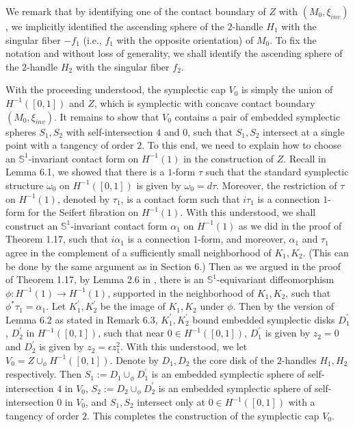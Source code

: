 \documentclass[11pt]{amsart}
\theoremstyle{plain}
\numberwithin{theorem}{section}
\theoremstyle{definition}
\newcommand{\s}{{\mathbb S}}
\begin{document}
We remark that by identifying one of the contact boundary of $Z$ with $(M_0,\xi_{inv})$, we implicitly
identified the ascending sphere of the $2$-handle $H_1$ with the singular fiber $-f_1$ (i.e., $f_1$ 
with the opposite orientation) of $M_0$. To fix the notation and without loss of generality, we shall identify
the ascending sphere of the $2$-handle $H_2$ with the singular fiber $f_2$. 

With the proceeding understood, the symplectic cap $V_0$ is simply the union of $H^{-1}([0,1])$ and $Z$, which is symplectic with concave contact boundary $(M_0,\xi_{inv})$. It remains to show that $V_0$ contains a pair of embedded symplectic spheres $S_1,S_2$ with self-intersection $4$ and $0$, such that $S_1,S_2$
intersect at a single point with a tangency of order $2$. To this end, we need to explain how to choose 
an $\s^1$-invariant contact form on $H^{-1}(1)$ in the construction of $Z$. Recall in Lemma 6.1,
we showed that there is a $1$-form $\tau$ such that the standard symplectic structure $\omega_0$ 
on $H^{-1}([0,1])$ is given by $\omega_0=d\tau$. Moreover, the restriction of $\tau$ on $H^{-1}(1)$, 
denoted by $\tau_1$, is a contact form such that $i\tau_1$ is a connection $1$-form for the Seifert 
fibration on $H^{-1}(1)$. With this understood, we shall construct an $\s^1$-invariant contact form $\alpha_1$ 
on $H^{-1}(1)$ as we did in the proof of Theorem 1.17, such that $i \alpha_1$ is a connection $1$-form, and moreover, $\alpha_1$ and $\tau_1$ agree in the complement of a sufficiently small neighborhood of
$K_1, K_2$. (This can be done by the same argument as in Section 6.) Then as we argued in the proof of 
Theorem 1.17, by Lemma 2.6 in \cite{C1}, there is an $\s^1$-equivariant diffeomorphism 
$\phi: H^{-1}(1)\rightarrow H^{-1}(1)$, supported in the neighborhood of 
$K_1,K_2$, such that $\phi^\ast \tau_1=\alpha_1$. Let $K_1^\prime, K_2^\prime$ be the image
of $K_1,K_2$ under $\phi$. Then by the version of Lemma 6.2 as stated in Remark 6.3, $K_1^\prime, K_2^\prime$
bound embedded symplectic disks $D_1^\prime$, $D_2^\prime$ in $H^{-1}([0,1])$, such that
near $0\in H^{-1}([0,1])$, $D_1^\prime$ is given by $z_2=0$ and $D_2^\prime$ is given by
$z_2=\epsilon z_1^2$. With this understood, we let $V_0=Z\cup_\phi H^{-1}([0,1])$. Denote by
$D_1,D_2$ the core disk of the $2$-handles $H_1,H_2$ respectively. Then $S_1:=D_1\cup_\phi 
D_1^\prime$ is an embedded symplectic sphere of self-intersection $4$ in $V_0$,
$S_2:=D_2\cup_\phi D_2^\prime$ is an embedded symplectic sphere of self-intersection $0$ in $V_0$, and $S_1,S_2$ intersect only at $0\in H^{-1}([0,1])$ with a tangency of order $2$. This completes the construction of the symplectic cap $V_0$.
\end{document}
